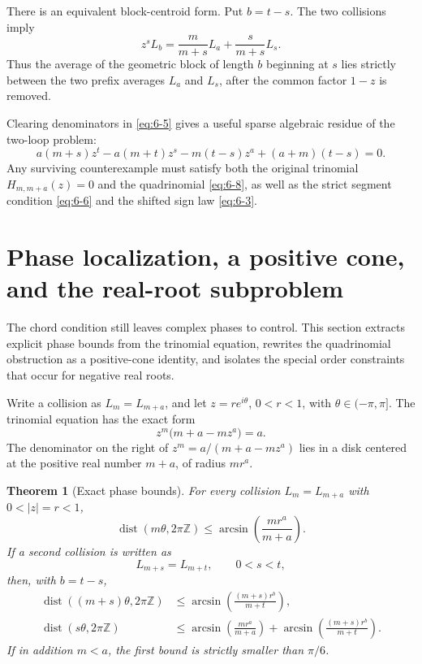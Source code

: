 \documentclass[11pt]{article}
\numberwithin{equation}{section}
\newtheorem{theorem}{Theorem}[section]
\theoremstyle{definition}
\newcommand{\Z}{\mathbb Z}
\begin{document}
There is an equivalent block-centroid form.  Put \(b=t-s\).  The two
collisions imply
\begin{equation}
 z^sL_b
 =\frac{m}{m+s}L_a+\frac{s}{m+s}L_s.
 \label{eq:6-7}
\end{equation}
Thus the average of the geometric block of length \(b\) beginning at \(s\)
lies strictly between the two prefix averages \(L_a\) and \(L_s\), after the
common factor \(1-z\) is removed.

Clearing denominators in \eqref{eq:6-5} gives a useful sparse algebraic residue of
the two-loop problem:
\begin{equation}
 a(m+s)z^t-a(m+t)z^s-m(t-s)z^a+(a+m)(t-s)=0.
 \label{eq:6-8}
\end{equation}
Any surviving counterexample must satisfy both the original trinomial
\(H_{m,m+a}(z)=0\) and the quadrinomial \eqref{eq:6-8}, as well as the strict
segment condition \eqref{eq:6-6} and the shifted sign law \eqref{eq:6-3}.

\section{Phase localization, a positive cone, and the real-root subproblem}
\label{sec:phase}

The chord condition still leaves complex phases to control.  This section extracts explicit phase bounds from the trinomial equation, rewrites the quadrinomial obstruction as a positive-cone identity, and isolates the special order constraints that occur for negative real roots.

Write a collision as \(L_m=L_{m+a}\), and let
\(z=re^{i\theta}\), \(0<r<1\), with \(\theta\in(-\pi,\pi]\).
The trinomial equation has the exact form
\begin{equation}
 z^m\bigl(m+a-mz^a\bigr)=a.
 \label{eq:7-1}
\end{equation}
The denominator on the right of
\(z^m=a/(m+a-mz^a)\) lies in a disk centered at the positive real number
\(m+a\), of radius \(mr^a\).

\begin{theorem}[Exact phase bounds]\label{thm:phase}
For every collision \(L_m=L_{m+a}\) with \(0<|z|=r<1\),
\begin{equation}
 \operatorname{dist}(m\theta,2\pi\Z)
 \leq
 \arcsin\!\left(\frac{mr^a}{m+a}\right).
 \label{eq:7-2}
\end{equation}
If a second collision is written as
\[
 L_{m+s}=L_{m+t},\qquad 0<s<t,
\]
then, with \(b=t-s\),
\begin{align}
 \operatorname{dist}((m+s)\theta,2\pi\Z)
 &\leq
 \arcsin\!\left(\frac{(m+s)r^b}{m+t}\right),
 \label{eq:7-3}\\
 \operatorname{dist}(s\theta,2\pi\Z)
 &\leq
 \arcsin\!\left(\frac{mr^a}{m+a}\right)
 +\arcsin\!\left(\frac{(m+s)r^b}{m+t}\right).
 \label{eq:7-4}
\end{align}
If in addition \(m<a\), the first bound is strictly smaller than \(\pi/6\).
\end{theorem}
\end{document}
